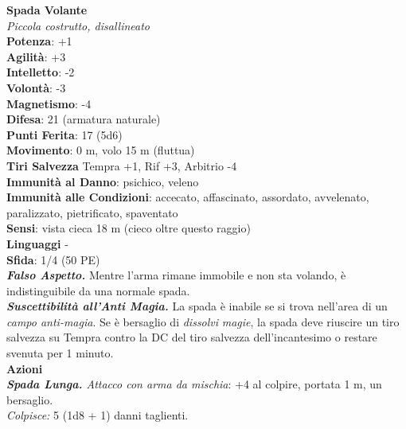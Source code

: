 \begin{multicols}{2}
\medskip\textbf{Spada Volante}\\
\emph{Piccola costrutto, disallineato}\\
\textbf{Potenza}: +1\\
\textbf{Agilità}: +3\\
\textbf{Intelletto}: -2\\
\textbf{Volontà}: -3\\
\textbf{Magnetismo}: -4\\
\textbf{Difesa}: 21 (armatura naturale)\\
\textbf{Punti Ferita}: 17 (5d6)\\
\textbf{Movimento}: 0 m, volo 15 m (fluttua)\\
\textbf{Tiri Salvezza}  Tempra +1, Rif +3, Arbitrio -4\\
\textbf{Immunità al Danno}: psichico, veleno\\
\textbf{Immunità alle Condizioni}: accecato, affascinato, assordato, avvelenato, paralizzato, pietrificato, spaventato\\
\textbf{Sensi}: vista cieca 18 m (cieco oltre questo raggio)\\
\textbf{Linguaggi} -\\
\textbf{Sfida}: 1/4 (50 PE)\smallskip\\
\emph{\textbf{Falso Aspetto.}} Mentre l'arma rimane immobile e non sta volando, è indistinguibile da una normale spada.\\
\emph{\textbf{Suscettibilità all'Anti Magia.}} La spada è inabile se si trova nell'area di un \emph{campo anti-magia}. Se è bersaglio di \emph{dissolvi} \emph{magie}, la spada deve riuscire un tiro salvezza su Tempra contro la DC del tiro salvezza dell'incantesimo o restare svenuta per 1 minuto.\\
\smallskip\textbf{Azioni}\\
\emph{\textbf{Spada Lunga.} Attacco con arma da mischia}: +4 al colpire, portata 1 m, un bersaglio.\\
\emph{Colpisce:} 5 (1d8 + 1) danni taglienti.\\


\end{multicols}
